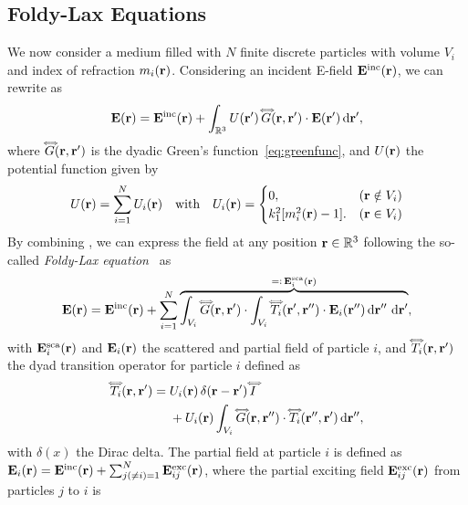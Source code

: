 \subsection{Foldy-Lax Equations}
\label{ssec:foldy-lax}
%
We now consider a medium filled with $N$ finite discrete particles with volume $V_i$ and index of refraction $m_i(\mathbf{r})$. Considering an incident E-field $\mathbf{E}^\text{inc}(\mathbf{r})$, we can rewrite  as
%
\begin{equation}
    \mathbf{E}(\mathbf{r}) = \mathbf{E}^\text{inc}(\mathbf{r}) + \int_{\mathbb{R}^3} U(\mathbf{r}')\,\accentset{\Longleftrightarrow}{G}(\mathbf{r},\mathbf{r}') \cdot \mathbf{E}(\mathbf{r}') \,\text{d}\mathbf{r}',
    \label{eq:EfieldParticles}
\end{equation}
%
where $\accentset{\Longleftrightarrow}{G}(\mathbf{r},\mathbf{r}')$ is the dyadic Green's function~\eqref{eq:greenfunc}, and $U(\mathbf{r})$ the potential function given by
%
\begin{equation}
    U(\mathbf{r}) = \sum_{i=1}^{N} U_i(\mathbf{r}) \quad \text{with} \quad U_i(\mathbf{r}) = \begin{cases} 
    0, & (\mathbf{r} \notin V_i)\\ 
    k_1^2[m_i^2(\mathbf{r})-1]. & (\mathbf{r} \in V_i)
    \end{cases}
    \label{eq:potential}
\end{equation}
%
By combining , we can express the field at any position $\mathbf{r}\in\mathbb{R}^3$ following the so-called \emph{Foldy-Lax equation}~\cite{foldy1945multiple,lax1951multiple} as
%
\begin{equation}
\mathbf{E}(\mathbf{r}) = \mathbf{E}^\text{inc}(\mathbf{r}) + \sum_{i=1}^N \overbrace{\int_{V_i} \accentset{\Longleftrightarrow}{G}(\mathbf{r},\mathbf{r}') \cdot \int_{V_i} \accentset{\Longleftrightarrow}{T}_i(\mathbf{r}',\mathbf{r}'') \cdot \mathbf{E}_i(\mathbf{r}'') \,\text{d}\mathbf{r}''\,\,\text{d}\mathbf{r}'}^{=\vcentcolon \,\mathbf{E}^\text{sca}_i(\mathbf{r})},    \label{eq:foldylax}
\end{equation}
%
with $\mathbf{E}^\text{sca}_i(\mathbf{r})$ and $\mathbf{E}_i(\mathbf{r})$ the scattered and partial field of particle $i$, and $\accentset{\Longleftrightarrow}{T}_i(\mathbf{r},\mathbf{r}')$ the dyad transition operator for particle $i$ defined as~\cite{tsang1985theory} 
\begin{equation}
\label{eq:dyadtransition}
    \begin{split}
        \accentset{\Longleftrightarrow}{T}_i(\mathbf{r},\mathbf{r}') =\;& U_i(\mathbf{r}) \,\delta(\mathbf{r}-\mathbf{r}')\,\accentset{\Longleftrightarrow}{I} \\
        & + U_i(\mathbf{r}) \int_{V_i} \accentset{\Longleftrightarrow}{G}(\mathbf{r},\mathbf{r}'') \cdot \accentset{\Longleftrightarrow}{T}_i(\mathbf{r}'',\mathbf{r}') \,\text{d}\mathbf{r}'',
    \end{split}
\end{equation}
%
with $\delta(x)$ the Dirac delta. 
%
The partial field at particle $i$ is defined as $\mathbf{E}_i(\mathbf{r})=\mathbf{E}^\text{inc}(\mathbf{r}) + \sum_{j(\neq i)=1}^N \mathbf{E}^\text{exc}_{ij}(\mathbf{r})$, where the partial exciting field $\mathbf{E}^\text{exc}_{ij}(\mathbf{r})$ from particles $j$ to $i$ is 
